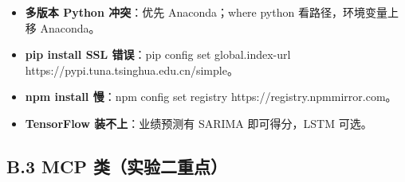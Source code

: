 \documentclass[
  american,
  chinese,
]{ctexart}
\providecommand{\tightlist}{%
  \setlength{\itemsep}{0pt}\setlength{\parskip}{0pt}}
\begin{document}
\begin{itemize}
\tightlist
\item
  {\textbf{\foreignlanguage{american}{多版本}}}\textbf{\foreignlanguage{american}{ Python }}{\textbf{\foreignlanguage{american}{冲突}}\foreignlanguage{american}{：优先}}\foreignlanguage{american}{ {Anaconda{；}where}
  python }{\foreignlanguage{american}{看路径，环境变量上移}}\foreignlanguage{american}{ Anaconda}\foreignlanguage{american}{。}
\item
  \textbf{\foreignlanguage{american}{pip install SSL }}{\textbf{\foreignlanguage{american}{错误}}\foreignlanguage{american}{：}\foreignlanguage{american}{pip}}\foreignlanguage{american}{ config set {{global.index}-url}
  https://pypi.tuna.tsinghua.edu.cn/simple}\foreignlanguage{american}{。}
\item
  {\textbf{\foreignlanguage{american}{npm}}}\textbf{\foreignlanguage{american}{ install }}{\textbf{\foreignlanguage{american}{慢}}\foreignlanguage{american}{：}\foreignlanguage{american}{npm}}\foreignlanguage{american}{ config set registry https://registry.npmmirror.com}\foreignlanguage{american}{。}
\item
  \textbf{\foreignlanguage{american}{TensorFlow }}{\textbf{\foreignlanguage{american}{装不上}}\foreignlanguage{american}{：业绩预测有}}\foreignlanguage{american}{ SARIMA }{\foreignlanguage{american}{即可得分，}\foreignlanguage{american}{LSTM}}\foreignlanguage{american}{ }{\foreignlanguage{american}{可选}}\foreignlanguage{american}{。}
\end{itemize}

\subsection{\texorpdfstring{\foreignlanguage{american}{B.3 MCP }{类（实验二重点）}\foreignlanguage{american}{}}{B.3 MCP 类（实验二重点）}}\label{b.3-mcp-ux7c7bux5b9eux9a8cux4e8cux91cdux70b9}
\end{document}
